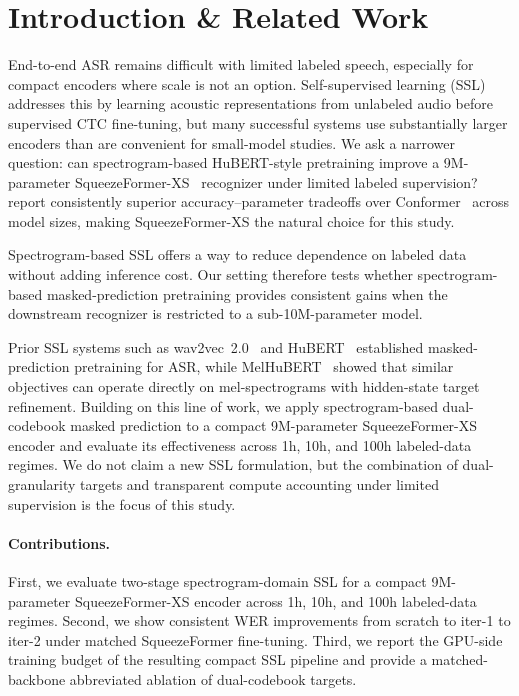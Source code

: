 \documentclass{article}
\begin{document}
\section{Introduction \& Related Work}
\label{sec:intro}


End-to-end ASR remains difficult with limited labeled speech,
especially for compact encoders where scale is not an option.
Self-supervised learning (SSL) addresses this by learning acoustic
representations from unlabeled audio before supervised CTC
fine-tuning, but many successful systems use substantially larger
encoders than are convenient for small-model studies. We ask a
narrower question: can spectrogram-based HuBERT-style pretraining
improve a 9M-parameter SqueezeFormer-XS~\citep{squeezeformer}
recognizer under limited labeled supervision?
\citet{squeezeformer} report consistently superior
accuracy--parameter tradeoffs over Conformer~\citep{conformer}
across model sizes, making SqueezeFormer-XS the natural
choice for this study.

Spectrogram-based SSL offers a way to reduce dependence on labeled
data without adding inference cost. Our setting therefore tests
whether spectrogram-based masked-prediction pretraining provides
consistent gains when the downstream recognizer is restricted to a
sub-10M-parameter model.

Prior SSL systems such as wav2vec~2.0~\citep{wav2vec2} and
HuBERT~\citep{hubert} established masked-prediction pretraining for
ASR, while MelHuBERT~\citep{melhubert} showed that similar objectives
can operate directly on mel-spectrograms with hidden-state target
refinement. Building on this line of work, we apply spectrogram-based
dual-codebook masked prediction to a compact 9M-parameter
SqueezeFormer-XS encoder and evaluate its effectiveness across 1h,
10h, and 100h labeled-data regimes. We do not claim a new SSL
formulation, but the combination of dual-granularity targets and
transparent compute accounting under limited supervision is the focus
of this study.

\paragraph{Contributions.}
First, we evaluate two-stage spectrogram-domain SSL for a compact
9M-parameter SqueezeFormer-XS encoder across 1h, 10h, and 100h
labeled-data regimes. Second, we show consistent WER improvements from
scratch to iter-1 to iter-2 under matched SqueezeFormer fine-tuning.
Third, we report the GPU-side training budget of the resulting compact
SSL pipeline and provide a matched-backbone abbreviated ablation of
dual-codebook targets.
\end{document}
